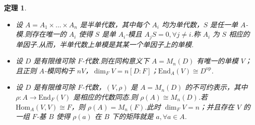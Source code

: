 \documentclass[11pt,a4paper]{article}
\theoremstyle{plain}
\newtheorem{thm}{定理}
\theoremstyle{definition}
\begin{document}
\begin{thm}
\begin{itemize}
    \item[(i)] 设 $A = A_1 \times \dots \times A_n$ 是半单代数，其中每个 $A_i$ 均为单代数，$S$ 是任一单 $A$-模.则存在唯一的 $A_i$ 使得 $S$ 是单 $A_i$-模且 $A_j S = 0, \forall j \neq i$.称 $A_i$ 为 $S$ 相应的单因子.从而，半单代数上单模是其某一个单因子上的单模.

    \item[(ii)] 设 $D$ 是有限维可除 $F$-代数.则在同构意义下 $A = M_n(D)$ 有唯一的单模 $V$；且正则 $A$-模同构于 $nV$，$\dim_F V = n[D:F]$；$\mathrm{End}_A(V) \cong D^{\mathrm{op}}$.

    \item[(iii)] 设 $D$ 是有限维可除 $F$-代数，$(V, \rho)$ 是 $A = M_n(D)$ 的不可约表示，其中 $\rho : A \to \mathrm{End}_F(V)$ 是相应的代数同态.则 $\rho(A) \cong M_n(D)$.若 $\mathrm{Hom}_A(V, V) \cong F$，则 $\rho(A) = M_n(F)$.此时 $\dim_F V = n$；并且存在 $V$ 的一组 $F$-基 $B$ 使得 $\rho(a)$ 在 $B$ 下的矩阵就是 $a, \forall a \in A$.
\end{itemize}
\end{thm}
\end{document}
